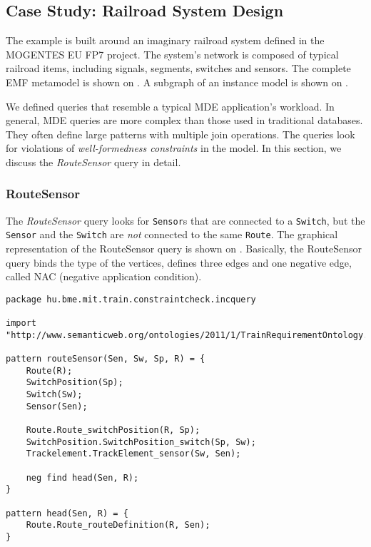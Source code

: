 
\subsection{Case Study: Railroad System Design}
\label{railroad-system}


The example is built around an imaginary railroad system defined in the \mbox{MOGENTES} EU FP7 \cite{MOGENTES} project. The system's network is composed of typical railroad items, including signals, segments, switches and sensors. The complete EMF metamodel is shown on . A subgraph of an instance model is shown on .

We defined queries that resemble a typical MDE application's workload. In general, MDE queries are more complex than those used in traditional databases. They often define large patterns with multiple join operations. The queries look for violations of \emph{well-formedness constraints} in the model. In this section, we discuss the \textit{RouteSensor} query in detail.


\subsubsection{RouteSensor}


The \textit{RouteSensor} query looks for \texttt{Sensor}s that are connected to a \texttt{Switch}, but the \texttt{Sensor} and the \texttt{Switch} are \emph{not} connected to the same \texttt{Route}. The graphical representation of the RouteSensor query is shown on . Basically, the RouteSensor query binds the type of the vertices, defines three edges and one negative edge, called NAC (negative application condition). 


\lstset{language=viatra}

\begin{lstlisting}[caption=The RouteSensor query in IQPL, label=lst:routesensor-iqpl]
package hu.bme.mit.train.constraintcheck.incquery

import "http://www.semanticweb.org/ontologies/2011/1/TrainRequirementOntology.owl" 

pattern routeSensor(Sen, Sw, Sp, R) = {
	Route(R);
	SwitchPosition(Sp);
	Switch(Sw);
	Sensor(Sen);
	
	Route.Route_switchPosition(R, Sp);
	SwitchPosition.SwitchPosition_switch(Sp, Sw);
	Trackelement.TrackElement_sensor(Sw, Sen);
	
	neg find head(Sen, R);	
}

pattern head(Sen, R) = {
	Route.Route_routeDefinition(R, Sen);
}
\end{lstlisting}

